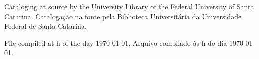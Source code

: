 \begin{fichacatalografica}
    \vspace*{\fill}

    \begin{center}

        \lang
        {Cataloging at source by the University Library of the Federal University of Santa Catarina.}
        {Catalogação na fonte pela Biblioteca Universitária da Universidade Federal de Santa Catarina.}

        \lang
        {File compiled at \currenttime h of the day \today.}
        {Arquivo compilado às \currenttime h do dia \today.}

\end{center}
\end{fichacatalografica}
